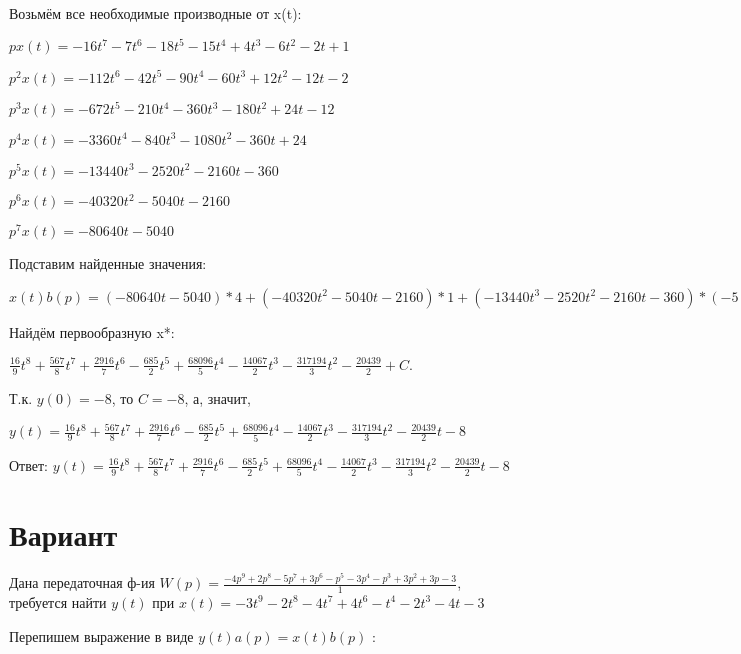 \documentclass{article}
\begin{document}
{{{{{Возьмём все необходимые производные от x(t):

$px(t)=-16t^{7}-7t^{6}-18t^{5}-15t^{4}+4t^{3}-6t^{2}-2t+1$

$p^2x(t)=-112t^{6}-42t^{5}-90t^{4}-60t^{3}+12t^{2}-12t-2$

$p^3x(t)=-672t^{5}-210t^{4}-360t^{3}-180t^{2}+24t-12$

$p^4x(t)=-3360t^{4}-840t^{3}-1080t^{2}-360t+24$

$p^5x(t)=-13440t^{3}-2520t^{2}-2160t-360$

$p^6x(t)=-40320t^{2}-5040t-2160$

$p^7x(t)=-80640t-5040$

Подставим найденные значения:

$x(t)b(p) = (-80640t-5040)*4+(-40320t^{2}-5040t-2160)*1+(-13440t^{3}-2520t^{2}-2160t-360)*(-5)+(-3360t^{4}-840t^{3}-1080t^{2}-360t+24)*1+(-672t^{5}-210t^{4}-360t^{3}-180t^{2}+24t-12)*(-4)+(-112t^{6}-42t^{5}-90t^{4}-60t^{3}+12t^{2}-12t-2)*(-5)+(-16t^{7}-7t^{6}-18t^{5}-15t^{4}+4t^{3}-6t^{2}-2t+1)*(-4)+(-16t^{7}-7t^{6}-18t^{5}-15t^{4}+4t^{3}-6t^{2}-2t+1)*3=16t^{7}+567t^{6}+2916t^{5}-2055t^{4}+68096t^{3}-28134t^{2}-317194t$





Найдём первообразную x*:

$\frac{16}{9}t^{8}+\frac{567}{8}t^{7}+\frac{2916}{7}t^{6}-\frac{685}{2}t^{5}+\frac{68096}{5}t^{4}-\frac{14067}{2}t^{3}-\frac{317194}{3}t^{2}-\frac{20439}{2}+C.$

Т.к. $y(0)=-8$, то $C=-8$, а, значит, 

$y(t)=\frac{16}{9}t^{8}+\frac{567}{8}t^{7}+\frac{2916}{7}t^{6}-\frac{685}{2}t^{5}+\frac{68096}{5}t^{4}-\frac{14067}{2}t^{3}-\frac{317194}{3}t^{2}-\frac{20439}{2}t-8$

Ответ: $y(t) = \frac{16}{9}t^{8}+\frac{567}{8}t^{7}+\frac{2916}{7}t^{6}-\frac{685}{2}t^{5}+\frac{68096}{5}t^{4}-\frac{14067}{2}t^{3}-\frac{317194}{3}t^{2}-\frac{20439}{2}t-8$

\section{Вариант}

Дана передаточная ф-ия $W(p)=\frac{-4p^{9}+2p^{8}-5p^{7}+3p^{6}-p^{5}-3p^{4}-p^{3}+3p^{2}+3p-3}{1}$, требуется найти $y(t)$ при $x(t)=-3t^{9}-2t^{8}-4t^{7}+4t^{6}-t^{4}-2t^{3}-4t-3$

Перепишем выражение в виде $y(t)a(p)=x(t)b(p)$ :

}}}}}
\end{document}
